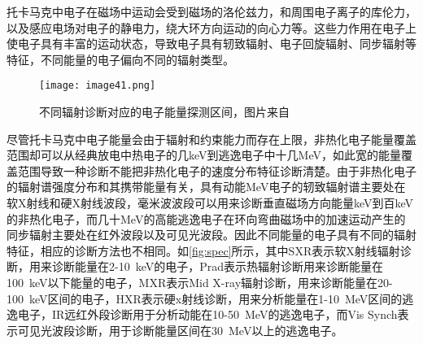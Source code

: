 托卡马克中电子在磁场中运动会受到磁场的洛伦兹力，和周围电子离子的库伦力，以及感应电场对电子的静电力，绕大环方向运动的向心力等。这些力作用在电子上使电子具有丰富的运动状态，导致电子具有轫致辐射、电子回旋辐射、同步辐射等特征，不同能量的电子偏向不同的辐射类型。
\begin{figure}[ht]
\centering
\texttt{[image: image41.png]}
\caption{\label{fig:spec}不同辐射诊断对应的电子能量探测区间，图片来自\cite{RN1435}}
\end{figure}\par
尽管托卡马克中电子能量会由于辐射和约束能力而存在上限，非热化电子能量覆盖范围却可以从经典放电中热电子的几keV到逃逸电子中十几MeV，如此宽的能量覆盖范围导致一种诊断不能把非热化电子的速度分布特征诊断清楚。由于非热化电子的辐射谱强度分布和其携带能量有关，具有动能MeV电子的轫致辐射谱主要处在软X射线和硬X射线波段\cite{RN972}，毫米波波段可以用来诊断垂直磁场方向能量keV到百keV的非热化电子\cite{RN1356}，而几十MeV的高能逃逸电子在环向弯曲磁场中的加速运动产生的同步辐射主要处在红外波段以及可见光波段\cite{RN973,RN956}。因此不同能量的电子具有不同的辐射特征，相应的诊断方法也不相同。如\autoref{fig:spec}所示，其中SXR表示软X射线辐射诊断，用来诊断能量在2-10~keV的电子，Prad表示热辐射诊断用来诊断能量在100~keV以下能量的电子，MXR表示Mid X-ray辐射诊断，用来诊断能量在20-100~keV区间的电子，HXR表示硬x射线诊断，用来分析能量在1-10~MeV区间的逃逸电子，IR远红外段诊断用于分析动能在10-50~MeV的逃逸电子，而Vis Synch表示可见光波段诊断，用于诊断能量区间在30~MeV以上的逃逸电子\cite{RN1435}。
